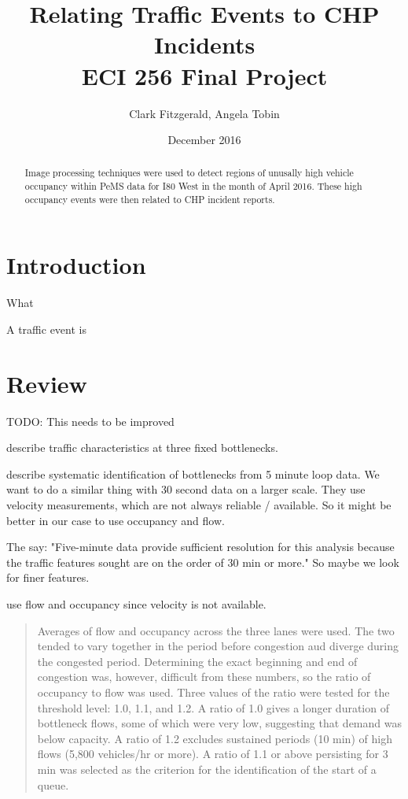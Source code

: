 \documentclass[12pt]{article}
\begin{document}
\title{Relating Traffic Events to CHP Incidents\\
ECI 256 Final Project}
\date{December 2016}
\author{Clark Fitzgerald, Angela Tobin}
\maketitle

\begin{abstract}

Image processing techniques were used to detect regions of
    unusally high vehicle occupancy 
within PeMS data for I80 West in the month of April 2016. 
These high occupancy events were then related to CHP incident reports.

\end{abstract}

\section{Introduction}

What 

A traffic event is 

\section{Review}

TODO: This needs to be improved

\cite{chung2007relation} describe traffic characteristics at three fixed bottlenecks.

\cite{chen2004systematic} describe systematic identification of bottlenecks from 5
minute loop data. We want to do a similar thing with 30 second data on a larger scale.
They use velocity measurements, which are not always reliable / available. So it might be 
better in our case to use occupancy and flow.

The say: "Five-minute data provide sufficient
resolution for this analysis because the traffic features sought are on
the order of 30 min or more." So maybe we look for finer features.

\cite{hall1991freeway} use flow and occupancy since velocity is not available.

\begin{quote}
Averages of flow and occupancy across the three lanes were
used. The two tended to vary together in the period before
congestion aud diverge during the congested period. Determining
the exact beginning and end of congestion was,
however, difficult from these numbers, so the ratio of occupancy
to flow was used. Three values of the ratio were tested
for the threshold level: 1.0, 1.1, and 1.2. A ratio of 1.0 gives
a longer duration of bottleneck flows, some of which were
very low, suggesting that demand was below capacity. A ratio
of 1.2 excludes sustained periods (10 min) of high flows (5,800
vehicles/hr or more). A ratio of 1.1 or above persisting for 3
min was selected as the criterion for the identification of the
start of a queue. 
\end{quote}
\end{document}
